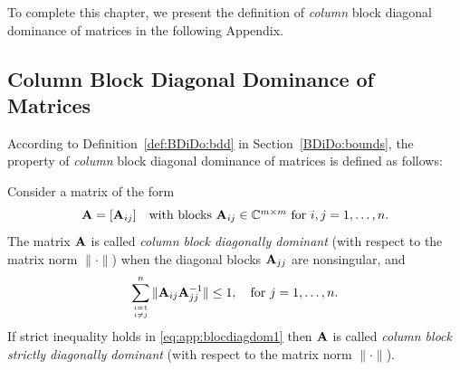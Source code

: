 To complete this chapter, we present the definition of \emph{column} block diagonal dominance of matrices in the following Appendix.

\begin{subappendices}
\section{Column Block Diagonal Dominance of Matrices}
\label{App:BDiDo:ColBDiDo}
According to Definition~\ref{def:BDiDo:bdd} in Section~\ref{BDiDo:bounds}, the
property of \emph{column} block diagonal dominance of matrices is defined as
follows:
\begin{definition}\label{def:App:colbdd}
Consider a matrix of the form
%
\begin{equation}\label{eq:app:blockmatrix}
\mathbf{A}=[\mathbf{A}_{ij}]\quad
\mbox{with blocks $\mathbf{A}_{ij}\in\mathbb{C}^{m\times m}$ for $i,j=1,\dots,n$.}
\end{equation}
%
The matrix $\mathbf{A}$ is called \emph{column block diagonally dominant} (with respect
to the matrix norm $\|\cdot\|$) when the diagonal blocks $\mathbf{A}_{jj}$ are
nonsingular, and
%
\begin{equation}\label{eq:app:blocdiagdom1}
\sum_{\atopfrac{i=1}{i\neq j}}^{n} \|\A_{ij}\A_{jj}^{-1}\| \leq 1,
\quad \text{for $j=1,\dots,n$}.
\end{equation}
%
If strict inequality holds in \eqref{eq:app:blocdiagdom1} then $\mathbf{A}$ is called
\emph{column block strictly diagonally dominant} (with respect to the matrix
norm $\|\cdot\|$).
\end{definition}


\end{subappendices}

